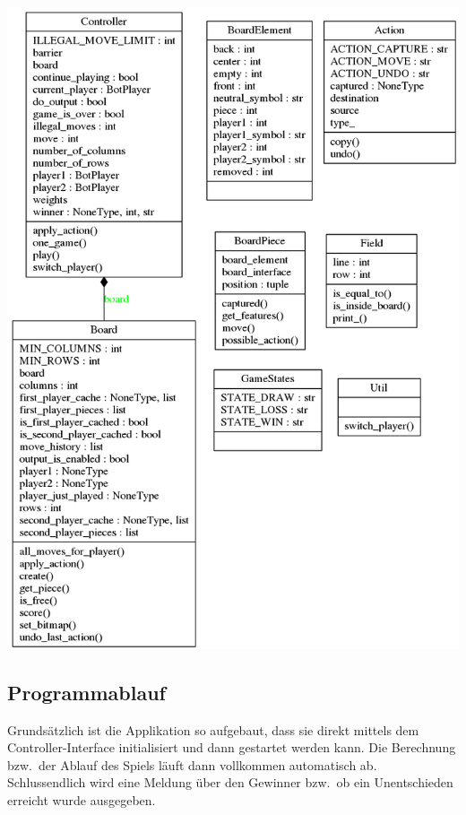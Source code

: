 \begin{minipage}[]{1.0\textwidth}
\begin{minipage}[t]{0.22\textwidth}
    \end{minipage}
    \begin{minipage}[t]{0.7\textwidth}
        \includegraphics[width=\textwidth]{images/classes_controller.png}
    \end{minipage}

\label{fig:class_structure}
\end{minipage}

\subsection{Programmablauf}
\label{subsec:program_flow}

Grundsätzlich ist die Applikation so aufgebaut, dass sie direkt mittels dem Controller-Interface initialisiert und dann gestartet werden kann. Die Berechnung bzw.\ der Ablauf des Spiels läuft dann vollkommen automatisch ab. Schlussendlich wird eine Meldung über den Gewinner bzw.\ ob ein Unentschieden erreicht wurde ausgegeben.

